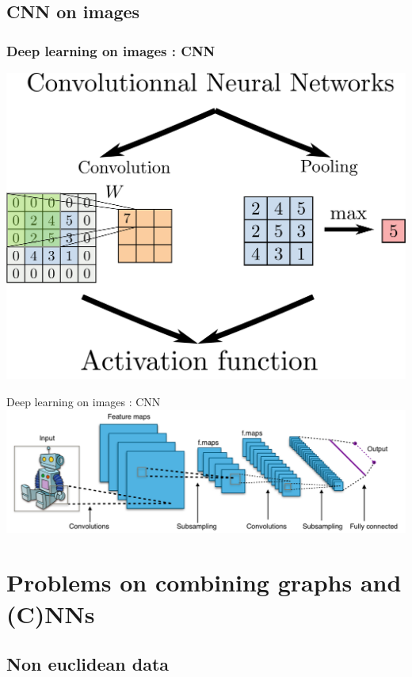 \documentclass[11pt]{beamer}
\begin{document}
\subsection{CNN on images}
\begin{frame}
  \frametitle{Deep learning on images : CNN}
  \begin{center}
    \includegraphics[height=0.75\textheight]{cnn}
  \end{center}
\end{frame}

\begin{frame}{Deep learning on images : CNN}
  \includegraphics[width=\textwidth]{typical_cnn}
  \flushright{\scriptsize [Wikipedia]}
\end{frame}

\section{Problems on combining graphs and (C)NNs}
\subsection{Non euclidean data}
\end{document}

